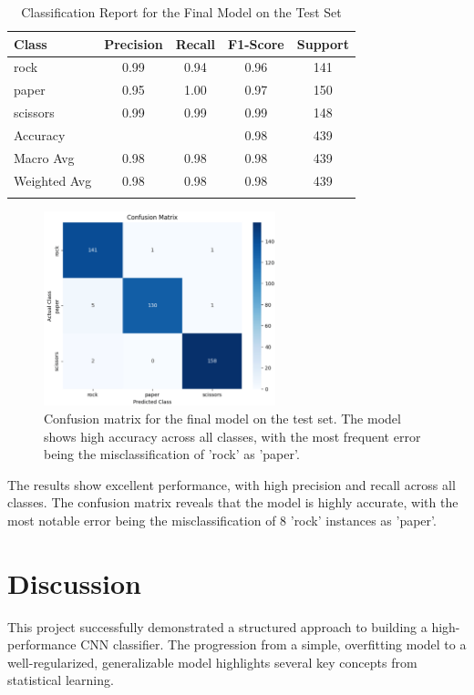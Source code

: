 \documentclass[pdflatex,sn-mathphys-num]{sn-jnl}%
\theoremstyle{thmstyleone}%
\theoremstyle{thmstyletwo}%
\theoremstyle{thmstylethree}%
\begin{document}
\begin{table}[h]
\caption{Classification Report for the Final Model on the Test Set}\label{tab:report}%
\begin{tabular}{@{}lcccc@{}}
\toprule
Class & Precision & Recall & F1-Score & Support \\
\midrule
rock     & 0.99 & 0.94 & 0.96 & 141 \\
paper    & 0.95 & 1.00 & 0.97 & 150 \\
scissors & 0.99 & 0.99 & 0.99 & 148 \\
\midrule
Accuracy &      &      & 0.98 & 439 \\
Macro Avg & 0.98 & 0.98 & 0.98 & 439 \\
Weighted Avg & 0.98 & 0.98 & 0.98 & 439 \\
\botrule
\end{tabular}
\end{table}

\begin{figure}[h]
\centering
\includegraphics[width=0.6\textwidth]{confusion_matrix.png}
\caption{Confusion matrix for the final model on the test set. The model shows high accuracy across all classes, with the most frequent error being the misclassification of 'rock' as 'paper'.}\label{fig:cm}
\end{figure}

The results show excellent performance, with high precision and recall across all classes. The confusion matrix reveals that the model is highly accurate, with the most notable error being the misclassification of 8 'rock' instances as 'paper'.

\section{Discussion}\label{sec12}

This project successfully demonstrated a structured approach to building a high-performance CNN classifier. The progression from a simple, overfitting model to a well-regularized, generalizable model highlights several key concepts from statistical learning.
\end{document}
